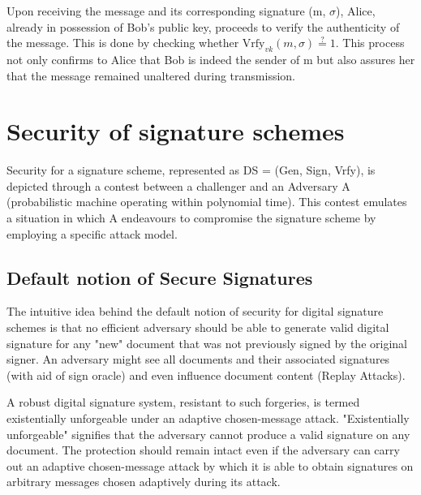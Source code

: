 \documentclass[]{final_report}
\theoremstyle{definition}
\begin{document}
Upon receiving the message and its corresponding signature (m, $\sigma$), Alice, already in possession of Bob's public key, proceeds to verify the authenticity of the message. This is done by checking whether $\text{Vrfy}_{vk}(m, \sigma) \stackrel{?}{=} 1$. This process not only confirms to Alice that Bob is indeed the sender of m but also assures her that the message remained unaltered during transmission.


\section{Security of signature schemes}
Security for a signature scheme, represented as DS = (Gen, Sign, Vrfy), is depicted through a contest between a challenger and an Adversary A (probabilistic machine operating within polynomial time). This contest emulates a situation in which A endeavours to compromise the signature scheme by employing a specific attack model. 

\subsection{Default notion of Secure Signatures}
The intuitive idea behind the default notion of security for digital signature schemes is that no efficient adversary should be able to generate valid digital signature for any "new" document that was not previously signed by the original signer.
An adversary might see all documents and their associated signatures (with aid of sign oracle) and even influence document content (Replay Attacks).

A robust digital signature system, resistant to such forgeries, is termed existentially unforgeable under an adaptive chosen-message attack. "Existentially unforgeable" signifies that the adversary cannot produce a valid signature on any document. The protection should remain intact even if the adversary can carry out an adaptive chosen-message attack by which it is able to obtain signatures on arbitrary messages chosen adaptively during its attack.
\end{document}
